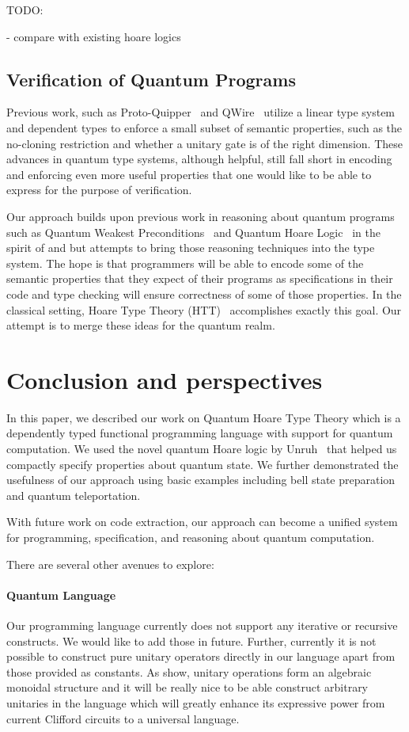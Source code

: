\documentclass[adraft,creativecommons]{eptcs}
\theoremstyle{definition}
\theoremstyle{remark}
\begin{document}
TODO:

- compare with existing hoare logics

\subsection{Verification of Quantum Programs}
Previous work, such as Proto-Quipper~\cite{rios2017,rios2017} and QWire~\cite{qwire2017,qwirepractice2017,rand2018} utilize a linear type system and dependent types to enforce a small subset of semantic properties, such as the no-cloning restriction and whether a unitary gate is of the right dimension. These advances in quantum type systems, although helpful, still fall short in encoding and enforcing even more useful properties that one would like to be able to express for the purpose of verification.

Our approach builds upon previous work in reasoning about quantum programs such as Quantum Weakest Preconditions~\cite{dhondt2006} and Quantum Hoare Logic~\cite{floydhoare2012} in the spirit of \cite{hoare1969} and \cite{dijkstra1976} but attempts to bring those reasoning techniques into the type system. The hope is that programmers will be able to encode some of the semantic properties that they expect of their programs as specifications in their code and type checking will ensure correctness of some of those properties. In the classical setting, Hoare Type Theory (HTT)~\cite{nanevski2008} accomplishes exactly this goal. Our attempt is to merge these ideas for the quantum realm.

\section{Conclusion and perspectives}
\label{sec:conclusion}
In this paper, we described our work on Quantum Hoare Type Theory which is a dependently typed functional programming language with support for quantum computation. We used the novel quantum Hoare logic by Unruh~\cite{unruh2019} that helped us compactly specify properties about quantum state. We further demonstrated the usefulness of our approach using basic examples including bell state preparation and quantum teleportation.

With future work on code extraction, our approach can become a unified system for programming, specification, and reasoning about quantum computation.

There are several other avenues to explore:

\paragraph{Quantum Language} Our programming language currently does not support any iterative or recursive constructs. We would like to add those in future. Further, currently it is not possible to construct pure unitary operators directly in our language apart from those provided as constants. As \cite{qio} show, unitary operations form an algebraic monoidal structure and it will be really nice to be able construct arbitrary unitaries in the language which will greatly enhance its expressive power from current Clifford circuits to a universal language.
\end{document}
